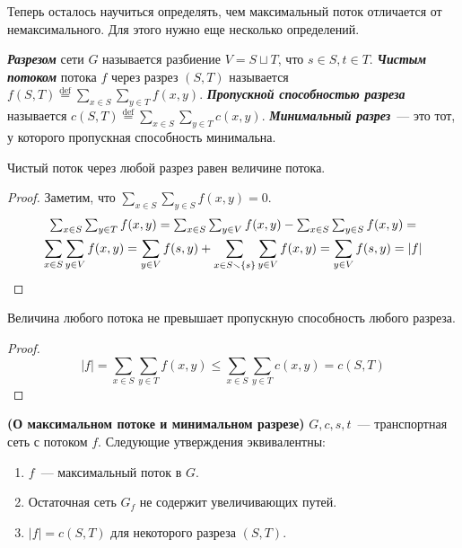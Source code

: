 Теперь осталось научиться определять, чем максимальный поток отличается от немаксимального. Для этого нужно еще несколько определений.
\begin{definition}
	{\bf\it Разрезом} сети $G$ называется разбиение $V=S\sqcup T$, что $s\in S,t\in T$.
	{\bf\it Чистым потоком} потока $f$ через разрез $(S,T)$ называется $f(S,T)\overset{\mathrm{def}}{=}\sum_{x\in S}\sum_{y\in T}f(x,y)$. 
	{\bf\it Пропускной способностью разреза} называется $c(S,T)\overset{\mathrm{def}}{=}\sum_{x\in S}\sum_{y\in T}c(x,y)$.
	{\bf\it Минимальный разрез}~--- это тот, у которого пропускная способность минимальна.
\end{definition}

\begin{lemma}\label{someshit3}
	Чистый поток через любой разрез равен величине потока.
\end{lemma}
\begin{proof}
	Заметим, что $\sum_{x\in S}\sum_{y\in S}f(x,y)=0$.
	\begin{multline*}
	$$
	\sum_{x\in S}\sum_{y\in T}f(x,y)=\sum_{x\in S}\sum_{y\in V}f(x,y)-\sum_{x\in S}\sum_{y\in S}f(x,y)=\\
	\sum_{x\in S}\sum_{y\in V}f(x,y)=\sum_{y\in V}f(s,y)+\sum_{x\in S\smallsetminus \{s\}}\sum_{y\in V}f(x,y)=\sum_{y\in V}f(s,y)=|f|
	$$
	\end{multline*}
\end{proof}
\begin{lemma}
	Величина любого потока не превышает пропускную способность любого разреза.
\end{lemma}
\begin{proof}
	$$
	|f|=\sum_{x\in S}\sum_{y\in T}f(x,y)\le\sum_{x\in S}\sum_{y\in T}c(x,y)=c(S,T)
	$$
\end{proof}
\begin{theorem} {\bf (О максимальном потоке и минимальном разрезе)}
	$G,c,s,t$~--- транспортная сеть с потоком $f$. Следующие утверждения эквивалентны:
	\begin{enumerate}
		\item $f$~--- максимальный поток в $G$.
		\item Остаточная сеть $G_f$ не содержит увеличивающих путей.
		\item $|f|=c(S,T)$ для некоторого разреза $(S,T)$.
	\end{enumerate}
\end{theorem}

